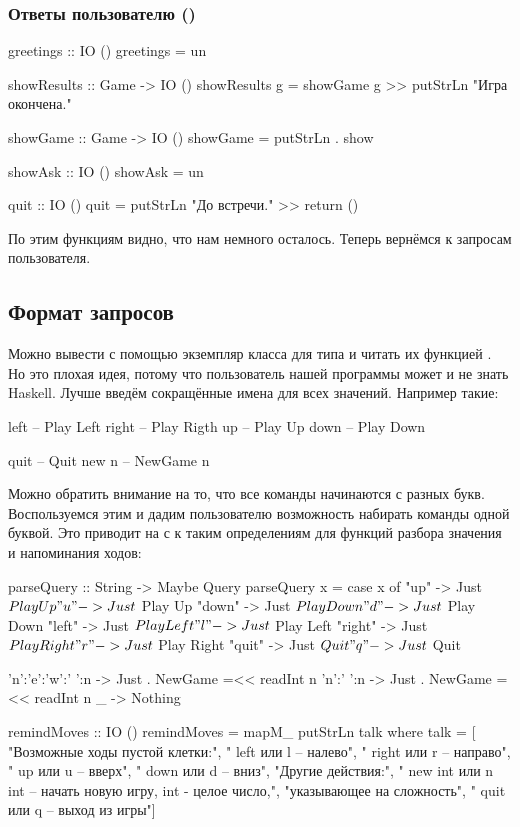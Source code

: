 \subsubsection{Ответы пользователю ()}

\begin{code}
greetings :: IO ()
greetings = un

showResults :: Game -> IO ()
showResults g = showGame g >> putStrLn "Игра окончена."

showGame :: Game -> IO ()
showGame = putStrLn . show

showAsk :: IO ()
showAsk = un

quit :: IO ()
quit = putStrLn "До встречи." >> return ()
\end{code}

По этим функциям видно, что нам немного осталось.
Теперь вернёмся к запросам пользователя.

\subsection{Формат запросов}

Можно вывести с помощью  экземпляр
класса  для типа  и читать их 
функцией . Но это плохая идея, потому что
пользователь нашей программы может и не знать Haskell.
Лучше введём сокращённые имена для всех значений.
Например такие:

\begin{code}
left        -- Play Left
right       -- Play Rigth
up          -- Play Up
down        -- Play Down

quit        -- Quit
new n       -- NewGame n
\end{code}

Можно обратить внимание на то, что все команды
начинаются с разных букв. Воспользуемся этим и
дадим пользователю возможность набирать команды одной буквой.
Это приводит на с к таким определениям для функций
разбора значения и напоминания ходов:

\begin{code}
parseQuery :: String -> Maybe Query
parseQuery x = case x of
    "up"    -> Just $ Play Up
    "u"     -> Just $ Play Up
    "down"  -> Just $ Play Down 
    "d"     -> Just $ Play Down 
    "left"  -> Just $ Play Left
    "l"     -> Just $ Play Left
    "right" -> Just $ Play Right
    "r"     -> Just $ Play Right
    "quit"  -> Just $ Quit
    "q"     -> Just $ Quit

    'n':'e':'w':' ':n   -> Just . NewGame =<< readInt n
    'n':' ':n           -> Just . NewGame =<< readInt n  
    _       -> Nothing

remindMoves :: IO ()
remindMoves = mapM_ putStrLn talk
    where talk = [
            "Возможные ходы пустой клетки:",
            "   left     или l       -- налево",
            "   right    или r       -- направо",
            "   up       или u       -- вверх",
            "   down     или d       -- вниз",
            "Другие действия:",
            "   new int  или n int -- начать новую игру, int - целое число,", 
                                      "указывающее на сложность",
            "   quit     или q      -- выход из игры"]
\end{code}



